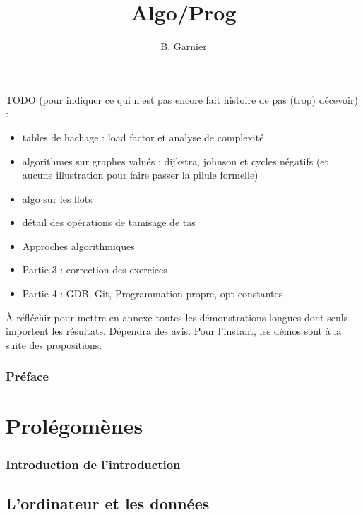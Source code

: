 \documentclass{minitelreport}
\begin{document}
	\title{Algo/Prog}
	\author{
		B. Garnier
	}
	\maketitle
\begin{refsection} %
TODO (pour indiquer ce qui n'est pas encore fait histoire de pas (trop) décevoir) :
\begin{itemize}
	\item tables de hachage : load factor et analyse de complexité 
	\item algorithmes sur graphes valués : dijkstra, johnson et cycles négatifs (et aucune illustration pour faire passer la pilule formelle)
	\item algo sur les flots
	\item détail des opérations de tamisage de tas
	\item Approches algorithmiques
	\item Partie 3 : correction des exercices 
	\item Partie 4 : GDB, Git, Programmation propre, opt constantes
\end{itemize}
À réfléchir pour mettre en annexe toutes les démonstrations longues dont seuls importent les résultats. Dépendra des avis. Pour l'instant, les démos sont à la suite des propositions.
\section*{Préface}

\tableofcontents
\listoftables
\listofdefinition
\newpage
\part{Prolégomènes}
\label{part:prol_gom_nes}
	\section*{Introduction de l'introduction}
	
	\chapter{L'ordinateur et les données}
	\label{cha:l_ordinateur_et_les_donn_es}
		

\end{refsection}
\end{document}

